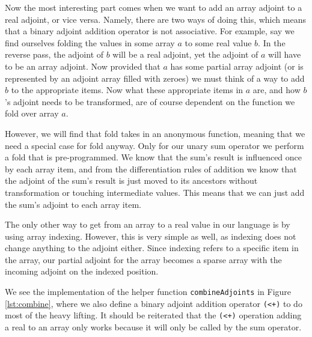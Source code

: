        Now the most interesting part comes when we want to add an array adjoint to a real adjoint, or vice versa.
        Namely, there are two ways of doing this, which means that a binary adjoint addition operator is not associative.
        For example, say we find ourselves folding the values in some array $a$ to some real value $b$.
        In the reverse pass, the adjoint of $b$ will be a real adjoint, yet the adjoint of $a$ will have to be an array adjoint.
        Now provided that $a$ has some partial array adjoint (or is represented by an adjoint array filled with zeroes) we must think of a way to add $b$ to the appropriate items.
        Now what these appropriate items in $a$ are, and how $b$'s adjoint needs to be transformed, are of course dependent on the function we fold over array $a$.

        However, we will find that fold takes in an anonymous function, meaning that we need a special case for fold anyway.
        Only for our unary sum operator we perform a fold that is pre-programmed.
        We know that the sum's result is influenced once by each array item, and from the differentiation rules of addition we know that the adjoint of the sum's result is just moved to its ancestors without transformation or touching intermediate values.
        This means that we can just add the sum's adjoint to each array item.

        The only other way to get from an array to a real value in our language is by using array indexing.
        However, this is very simple as well, as indexing does not change anything to the adjoint either.
        Since indexing refers to a specific item in the array, our partial adjoint for the array becomes a sparse array with the incoming adjoint on the indexed position.

        We see the implementation of the helper function \texttt{combineAdjoints} in Figure \ref{lst:combine}, where we also define a binary adjoint addition operator \lstinline{(<+)} to do most of the heavy lifting.
        It should be reiterated that the \lstinline{(<+)} operation adding a real to an array only works because it will only be called by the sum operator.

